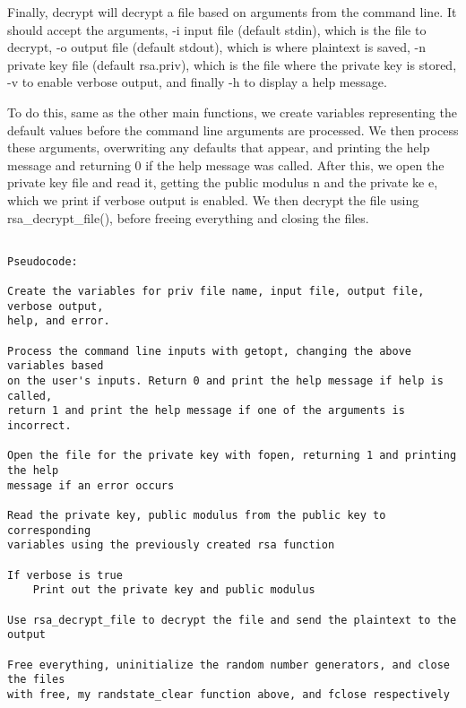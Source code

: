 \documentclass[11pt]{article}
\begin{document}
Finally, decrypt will decrypt a file based on arguments from the command line. It should accept the arguments, -i input file (default stdin), which is the file to decrypt, -o output file (default stdout), which is where plaintext is saved, -n private key file (default rsa.priv), which is the file where the private key is stored, -v to enable verbose output, and finally -h to display a help message.

To do this, same as the other main functions, we create variables representing the default values before the command line arguments are processed. We then process these arguments, overwriting any defaults that appear, and printing the help message and returning 0 if the help message was called. After this, we open the private key file and read it, getting the public modulus n and the private ke e, which we print if verbose output is enabled. We then decrypt the file using rsa\_decrypt\_file(), before freeing everything and closing the files.

\begin{verbatim}

Pseudocode:

Create the variables for priv file name, input file, output file, verbose output,
help, and error.

Process the command line inputs with getopt, changing the above variables based
on the user's inputs. Return 0 and print the help message if help is called,
return 1 and print the help message if one of the arguments is incorrect.

Open the file for the private key with fopen, returning 1 and printing the help
message if an error occurs

Read the private key, public modulus from the public key to corresponding
variables using the previously created rsa function

If verbose is true
    Print out the private key and public modulus

Use rsa_decrypt_file to decrypt the file and send the plaintext to the output

Free everything, uninitialize the random number generators, and close the files
with free, my randstate_clear function above, and fclose respectively

\end{verbatim}
\end{document}
